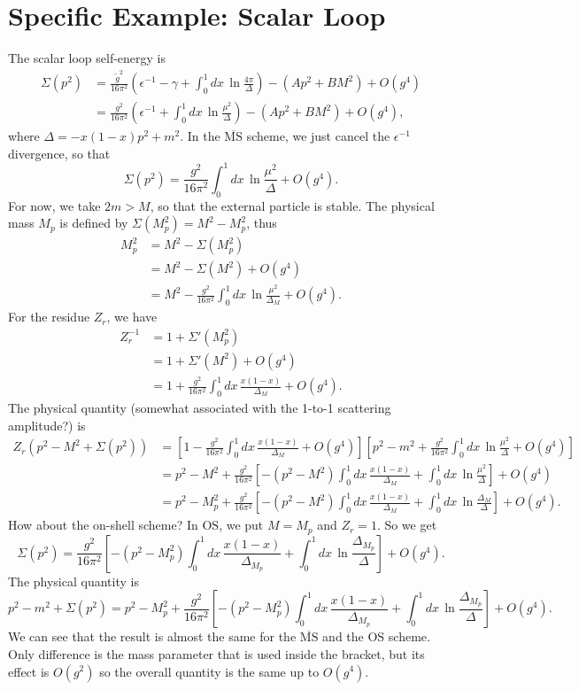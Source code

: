 \documentclass[11pt]{article}
\theoremstyle{definition}
\theoremstyle{remark}
\begin{document}
	\section{Specific Example: Scalar Loop}
	The scalar loop self-energy is
	\begin{align*}
		\Sigma(p^{2})&=\frac{\tilde{g}^{2}}{16\pi^{2}}\left(\epsilon^{-1}-\gamma+\int_{0}^{1}dx\,\ln\frac{4\pi}{\Delta}\right)-(Ap^{2}+BM^{2})+O(g^{4})\\
		&=\frac{g^{2}}{16\pi^{2}}\left(\epsilon^{-1}+\int_{0}^{1}dx\,\ln\frac{\mu^{2}}{\Delta}\right)-(Ap^{2}+BM^{2})+O(g^{4}),
	\end{align*}
	where $\Delta=-x(1-x)p^{2}+m^{2}$.
	In the $\overline{\mathrm{MS}}$ scheme, we just cancel the $\epsilon^{-1}$ divergence, so that
	\[\Sigma(p^{2})=\frac{g^{2}}{16\pi^{2}}\int_{0}^{1}dx\,\ln\frac{\mu^{2}}{\Delta}+O(g^{4}).\]
	For now, we take $2m>M$, so that the external particle is stable.
	The physical mass $M_{p}$ is defined by $\Sigma(M_{p}^{2})=M^{2}-M_{p}^{2}$, thus
	\begin{align*}
		M_{p}^{2}&=M^{2}-\Sigma(M_{p}^{2})\\
		&=M^{2}-\Sigma(M^{2})+O(g^{4})\\
		&=M^{2}-\frac{g^{2}}{16\pi^{2}}\int_{0}^{1}dx\,\ln\frac{\mu^{2}}{\Delta_{M}}+O(g^{4}).
	\end{align*}
	For the residue $Z_{r}$, we have
	\begin{align*}
		Z_{r}^{-1}&=1+\Sigma'(M_{p}^{2})\\
		&=1+\Sigma'(M^{2})+O(g^{4})\\
		&=1+\frac{g^{2}}{16\pi^{2}}\int_{0}^{1}dx\,\frac{x(1-x)}{\Delta_{M}}+O(g^{4}).
	\end{align*}
	The physical quantity (somewhat associated with the 1-to-1 scattering amplitude?) is
	\begin{align*}
		Z_{r}(p^{2}-M^{2}+\Sigma(p^{2}))&=\left[1-\frac{g^{2}}{16\pi^{2}}\int_{0}^{1}dx\,\frac{x(1-x)}{\Delta_{M}}+O(g^{4})\right]\left[p^{2}-m^{2}+\frac{g^{2}}{16\pi^{2}}\int_{0}^{1}dx\,\ln\frac{\mu^{2}}{\Delta}+O(g^{4})\right]\\
		&=p^{2}-M^{2}+\frac{g^{2}}{16\pi^{2}}\left[-(p^{2}-M^{2})\int_{0}^{1}dx\,\frac{x(1-x)}{\Delta_{M}}+\int_{0}^{1}dx\,\ln\frac{\mu^{2}}{\Delta}\right]+O(g^{4})\\
		&=p^{2}-M_{p}^{2}+\frac{g^{2}}{16\pi^{2}}\left[-(p^{2}-M^{2})\int_{0}^{1}dx\,\frac{x(1-x)}{\Delta_{M}}+\int_{0}^{1}dx\,\ln\frac{\Delta_{M}}{\Delta}\right]+O(g^{4}).
	\end{align*}
	How about the on-shell scheme?
	In $\mathrm{OS}$, we put $M=M_{p}$ and $Z_{r}=1$.
	So we get
	\[\Sigma(p^{2})=\frac{g^{2}}{16\pi^{2}}\left[-(p^{2}-M_{p}^{2})\int_{0}^{1}dx\,\frac{x(1-x)}{\Delta_{M_{p}}}+\int_{0}^{1}dx\,\ln\frac{\Delta_{M_{p}}}{\Delta}\right]+O(g^{4}).\]
	The physical quantity is
	\[p^{2}-m^{2}+\Sigma(p^{2})=p^{2}-M_{p}^{2}+\frac{g^{2}}{16\pi^{2}}\left[-(p^{2}-M_{p}^{2})\int_{0}^{1}dx\,\frac{x(1-x)}{\Delta_{M_{p}}}+\int_{0}^{1}dx\,\ln\frac{\Delta_{M_{p}}}{\Delta}\right]+O(g^{4}).\]
	We can see that the result is almost the same for the $\overline{\mathrm{MS}}$ and the $\mathrm{OS}$ scheme.
	Only difference is the mass parameter that is used inside the bracket, but its effect is $O(g^{2})$ so the overall quantity is the same up to $O(g^{4})$.
	
\end{document}
